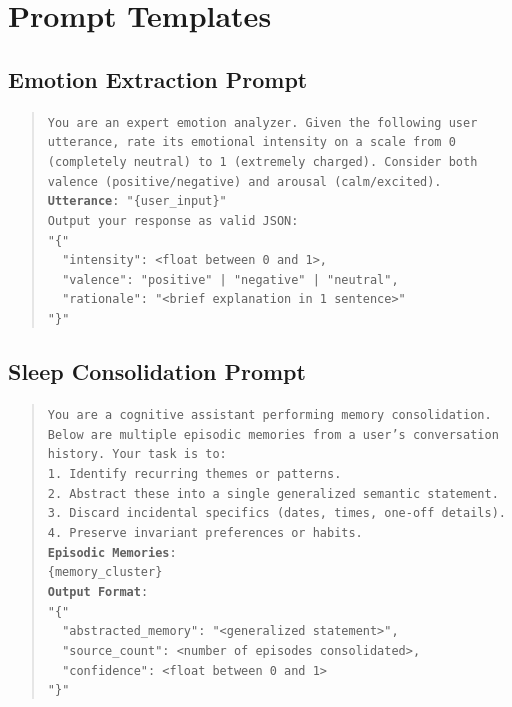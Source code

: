 \section{Prompt Templates}
\label{app:prompts}

\subsection{Emotion Extraction Prompt}
\begin{quote}
\small
\texttt{You are an expert emotion analyzer. Given the following user utterance, rate its emotional intensity on a scale from 0 (completely neutral) to 1 (extremely charged). Consider both valence (positive/negative) and arousal (calm/excited).\\[1em]
\textbf{Utterance}: "\{user\_input\}"\\[1em]
Output your response as valid JSON:\\
\texttt{"\{"}\\
\ \ \texttt{"intensity": <float between 0 and 1>,}\\
\ \ \texttt{"valence": "positive" | "negative" | "neutral",}\\
\ \ \texttt{"rationale": "<brief explanation in 1 sentence>"}\\
\texttt{"\}}"}
\end{quote}

\subsection{Sleep Consolidation Prompt}
\begin{quote}
\small
\texttt{You are a cognitive assistant performing memory consolidation. Below are multiple episodic memories from a user's conversation history. Your task is to:\\
1. Identify recurring themes or patterns.\\
2. Abstract these into a single generalized semantic statement.\\
3. Discard incidental specifics (dates, times, one-off details).\\
4. Preserve invariant preferences or habits.\\[1em]
\textbf{Episodic Memories}:\\
\{memory\_cluster\}\\[1em]
\textbf{Output Format}:\\
\texttt{"\{"}\\
\ \ \texttt{"abstracted\_memory": "<generalized statement>",}\\
\ \ \texttt{"source\_count": <number of episodes consolidated>,}\\
\ \ \texttt{"confidence": <float between 0 and 1>}\\
\texttt{"\}}"}
\end{quote}

